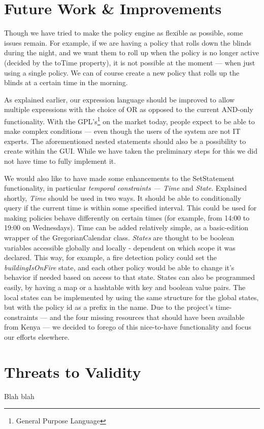 \section{Future Work \& Improvements}\label{subsec:improvements}
Though we have tried to make the policy engine as flexible as possible, some issues remain. For example, if we are having a policy that rolls down the blinds during the night, and we want them to roll up when the policy is no longer active (decided by the toTime property), it is not possible at the moment --- when just using a single policy. We can of course create a new policy that rolls up the blinds at a certain time in the morning.

As explained earlier, our expression language should be improved to allow multiple expressions with the choice of OR as opposed to the current AND-only functionality. With the GPL's\footnote{General Purpose Language} on the market today, people expect to be able to make complex conditions --- even though the users of the system are not IT experts. The aforementioned nested statements should also be a possibility to create within the GUI. While we have taken the preliminary steps for this we did not have time to fully implement it.

We would also like to have made some enhancements to the SetStatement functionality, in particular \textit{temporal constraints --- Time} and \textit{State}. Explained shortly, \textit{Time} should be used in two ways. It should be able to conditionally query if the current time is within some specified interval. This could be used for making policies behave differently on certain times (for example, from 14:00 to 19:00 on Wednesdays). Time can be added relatively simple, as a basic-edition wrapper of the GregorianCalendar class. \textit{States} are thought to be boolean variables accessible globally and locally - dependent on which scope it was declared. This way, for example, a fire detection policy could set the \textit{buildingIsOnFire} state, and each other policy would be able to change it's behavior if needed based on access to that state. States can also be programmed easily, by having a map or a hashtable with key and boolean value pairs. The local states can be implemented by using the same structure for the global states, but with the policy id as a prefix in the name. Due to the project's time-constraints --- and the four missing resources that should have been available from Kenya --- we decided to forego of this nice-to-have functionality and focus our efforts elsewhere. 

\section{Threats to Validity}\label{subsec:threatstovalidity}
Blah blah